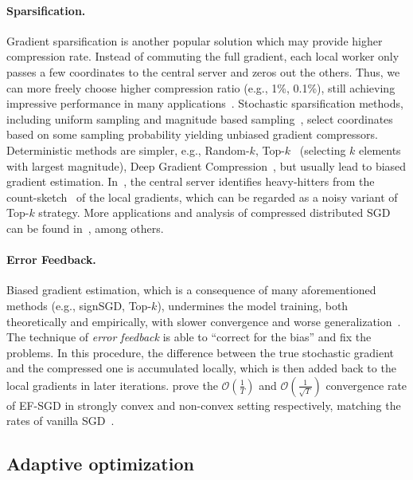 \documentclass[11pt]{article}
\begin{document}
\paragraph{Sparsification.} Gradient sparsification is another popular solution which may provide higher compression rate. Instead of commuting the full gradient, each local worker only passes a few coordinates to the central server and zeros out the others. Thus, we can more freely choose higher compression ratio (e.g., 1\%, 0.1\%), still achieving impressive performance in many applications~\cite{Proc:Lin_ICLR18}. Stochastic sparsification methods, including uniform sampling and magnitude based sampling~\cite{wangni2018gradient}, select coordinates based on some sampling probability yielding unbiased gradient compressors. Deterministic methods are simpler, e.g., Random-$k$, Top-$k$~\cite{stich2018sparsified,shi2019convergence} (selecting $k$ elements with largest magnitude), Deep Gradient Compression~\cite{Proc:Lin_ICLR18}, but usually lead to biased gradient estimation. In~\cite{Proc:Ivkin_NIPS19}, the central server identifies heavy-hitters from the count-sketch~\cite{Proc:Charikar_ICALP02} of the local gradients, which can be regarded as a noisy variant of Top-$k$ strategy. More applications and analysis of compressed distributed SGD can be found in~\cite{jiang2018linear,Proc:Shen_ICML18,alistarh2018convergence,Proc:Basu_NIPS19,Proc:Jiang_SIGMOD18}, among others.

\paragraph{Error Feedback.} Biased gradient estimation, which is a consequence of many aforementioned methods (e.g., signSGD, Top-$k$), undermines the model training, both theoretically and empirically, with slower convergence and worse generalization~\cite{ajalloeian2020analysis,Arxiv:Beznosikov20}. The technique of \textit{error feedback} is able to ``correct for the bias'' and fix the problems. In this procedure, the difference between the true stochastic gradient and the compressed one is accumulated locally, which is then added back to the local gradients in later iterations. \cite{stich2018sparsified,karimireddy2019error} prove the $\mathcal O(\frac{1}{T})$ and $\mathcal O(\frac{1}{\sqrt T})$ convergence rate of EF-SGD in strongly convex and non-convex setting respectively, matching the rates of vanilla SGD~\cite{nemirovski2009robust,ghadimi2013stochastic}.


\subsection{Adaptive optimization}
\end{document}
